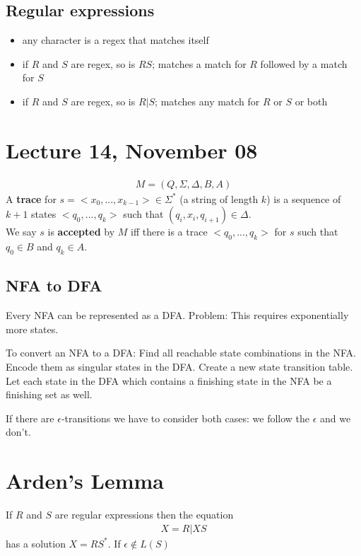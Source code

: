 \documentclass{article}
\begin{document}
\subsection{Regular expressions}
\begin{definition}
	\begin{itemize}
		\item any character is a regex that matches itself
		\item if $R$ and $S$ are regex, so is $RS$; matches a match for $R$ followed by a match for $S$
		\item if $R$ and $S$ are regex, so is $R|S$; matches any match for $R$ or $S$ or both
	\end{itemize}
\end{definition}
\section{Lecture 14, November 08}
\begin{definition}
	\begin{align*}
		M=(Q,\Sigma, \Delta, B, A)
	\end{align*}
	A \textbf{trace} for $s=<x_0,..., x_{k-1}>\in \Sigma^*$ (a string of length $k$) is a sequence of $k+1$ states $<q_0, ..., q_k>$ such that $(q_i, x_i, q_{i+1})\in\Delta$.\\
	We say $s$ is \textbf{accepted} by $M$ iff there is a trace $<q_0, ..., q_k>$ for $s$ such that $q_0\in B$ and $q_k\in A$.
\end{definition}
\subsection{NFA to DFA}
Every NFA can be represented as a DFA. Problem: This requires exponentially more states.
\begin{example}
	To convert an NFA to a DFA: Find all reachable state combinations in the NFA. Encode them as singular states in the DFA. Create a new state transition table. Let each state in the DFA which contains a finishing state in the NFA be a finishing set as well.
\end{example}
If there are $\epsilon$-transitions we have to consider both cases: we follow the $\epsilon$ and we don't.
\section{Arden's Lemma}
\begin{theorem}
	If $R$ and $S$ are regular expressions then the equation\begin{align*}
		X = R | X S
	\end{align*}
	has a solution $X = R S^*$. If $\epsilon\not\in L(S)$
\end{theorem}
\end{document}
